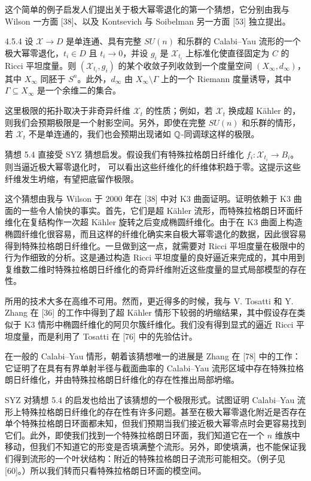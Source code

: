 这个简单的例子启发人们提出关于极大幂零退化的第一个猜想，它分别由我与 Wilson 一方面 [38]、以及 Kontsevich 与 Soibelman 另一方面 [53] 独立提出。

\begin{conjecture}{4.5.4}
设 $\mathcal{X}\to D$ 是单连通、具有完整 $SU(n)$ 和乐群的 Calabi--Yau 流形的一个极大幂零退化，$t_i\in D$ 且 $t_i\to0$，并设 $g_i$ 是 $\mathcal{X}_{t_i}$ 上标准化使直径固定为 $C$ 的 Ricci 平坦度量。则 $(\mathcal{X}_{t_i},g_i)$ 的某个收敛子列收敛到一个度量空间 $(X_\infty,d_\infty)$，其中 $X_\infty$ 同胚于 $S^n$。此外，$d_\infty$ 由 $X_\infty\setminus\Gamma$ 上的一个 Riemann 度量诱导，其中 $\Gamma\subseteq X_\infty$ 是一个余维二的集合。
\end{conjecture}

这里极限的拓扑取决于非奇异纤维 $\mathcal{X}_t$ 的性质；例如，若 $\mathcal{X}_t$ 换成超 Kähler 的，则我们会预期极限是一个射影空间。另外，即使在完整 $SU(n)$ 和乐群的情形，若 $\mathcal{X}_t$ 不是单连通的，我们也会预期出现诸如 $\mathbb{Q}$-同调球这样的极限。

猜想 5.4 直接受 SYZ 猜想启发。假设我们有特殊拉格朗日纤维化 $f_i:\mathcal{X}_{t_i}\to B_i$。则当逼近极大幂零退化时，
可以看出这些纤维化的纤维体积趋于零。这提示这些纤维发生坍缩，有望把底留作极限。

这个猜想由我与 Wilson 于 2000 年在 [38] 中对 K3 曲面证明。证明依赖于 K3 曲面的一些令人愉快的事实。首先，它们是超 Kähler 流形，而特殊拉格朗日环面纤维化在复结构作一次超 Kähler 旋转之后变成椭圆纤维化。由于在 K3 曲面上构造椭圆纤维化很容易，而且这样的纤维化确实来自极大幂零退化的数据，因此很容易得到特殊拉格朗日纤维化。一旦做到这一点，就需要对 Ricci 平坦度量在极限中的行为作细致的分析。这是通过构造 Ricci 平坦度量的良好逼近来完成的，其中用到复维数二维时特殊拉格朗日纤维化的奇异纤维附近这些度量的显式局部模型的存在性。

所用的技术大多在高维不可用。然而，更近得多的时候，我与 V. Tosatti 和 Y. Zhang 在 [36] 的工作中得到了超 Kähler 情形下较弱的坍缩结果，其中假设存在类似于 K3 情形中椭圆纤维化的阿贝尔簇纤维化。我们没有得到显式的逼近 Ricci 平坦度量，而是利用了 Tosatti 在 [76] 中的先验估计。

在一般的 Calabi--Yau 情形，朝着该猜想唯一的进展是 Zhang 在 [78] 中的工作：它证明了在具有有界单射半径与截面曲率的 Calabi--Yau 流形区域中存在特殊拉格朗日纤维化，并由特殊拉格朗日纤维化的存在性推出局部坍缩。

SYZ 对猜想 5.4 的启发也给出了该猜想的一个极限形式。试图证明 Calabi--Yau 流形上特殊拉格朗日纤维化的存在性有许多问题。甚至在极大幂零退化附近是否存在单个特殊拉格朗日环面都未知，但我们预期当我们接近极大幂零点时会更容易找到它们。此外，即使我们找到一个特殊拉格朗日环面，我们知道它在一个 $n$ 维族中移动，但我们不知道它的形变是否填满整个流形。另外，即使填满，也不能保证我们得到流形的一个叶状结构：附近的特殊拉格朗日子流形可能相交。（例子见 [60]。）所以我们转而只看特殊拉格朗日环面的模空间。

